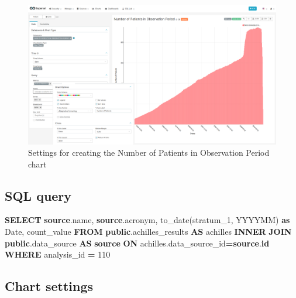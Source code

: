 \documentclass[
]{book}
\newenvironment{Shaded}{\begin{snugshade}}{\end{snugshade}}
\newcommand{\DataTypeTok}[1]{\textcolor[rgb]{0.13,0.29,0.53}{#1}}
\newcommand{\DecValTok}[1]{\textcolor[rgb]{0.00,0.00,0.81}{#1}}
\newcommand{\FunctionTok}[1]{\textcolor[rgb]{0.00,0.00,0.00}{#1}}
\newcommand{\KeywordTok}[1]{\textcolor[rgb]{0.13,0.29,0.53}{\textbf{#1}}}
\newcommand{\NormalTok}[1]{#1}
\newcommand{\OperatorTok}[1]{\textcolor[rgb]{0.81,0.36,0.00}{\textbf{#1}}}
\newcommand{\StringTok}[1]{\textcolor[rgb]{0.31,0.60,0.02}{#1}}
\begin{document}
\begin{figure}
\includegraphics[width=1\linewidth]{images/05-observation_period/02-number_of_patients_in_observation_period} \caption{Settings for creating the Number of Patients in Observation Period chart}\label{fig:numPatientsInObserPeriod}
\end{figure}

\hypertarget{sql-query-13}{%
\subsection{SQL query}\label{sql-query-13}}

\begin{Shaded}
\begin{Highlighting}[]
\KeywordTok{SELECT} \KeywordTok{source}\NormalTok{.name,}
       \KeywordTok{source}\NormalTok{.acronym,}
       \FunctionTok{to\_date}\NormalTok{(stratum\_1, }\StringTok{\textquotesingle{}YYYYMM\textquotesingle{}}\NormalTok{) }\KeywordTok{as} \DataTypeTok{Date}\NormalTok{,}
\NormalTok{       count\_value}
\KeywordTok{FROM} \KeywordTok{public}\NormalTok{.achilles\_results }\KeywordTok{AS}\NormalTok{ achilles}
\KeywordTok{INNER} \KeywordTok{JOIN} \KeywordTok{public}\NormalTok{.data\_source }\KeywordTok{AS} \KeywordTok{source} \KeywordTok{ON}\NormalTok{ achilles.data\_source\_id}\OperatorTok{=}\KeywordTok{source}\NormalTok{.}\KeywordTok{id}
\KeywordTok{WHERE}\NormalTok{ analysis\_id }\OperatorTok{=} \DecValTok{110}
\end{Highlighting}
\end{Shaded}

\hypertarget{chart-settings-13}{%
\subsection{Chart settings}\label{chart-settings-13}}
\end{document}
